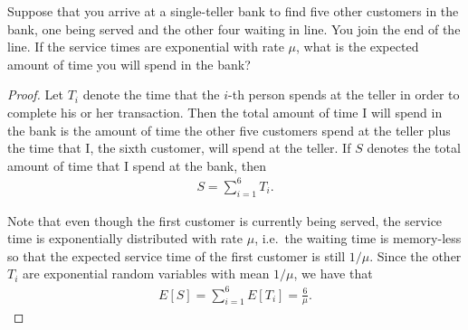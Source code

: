 \begin{problem}{5.2}
  Suppose that you arrive at a single-teller bank to find five other customers in
  the bank, one being served and the other four waiting in line. You join the end of the line.
  If the service times are exponential with rate $\mu$, what is the expected amount of time
  you will spend in the bank?
\end{problem}

\begin{proof}
  Let $T_i$ denote the time that the $i$-th person spends at the teller in order to complete his
  or her transaction.
  Then the total amount of time I will spend in the bank is the amount of time the other
  five customers spend at the teller plus the time that I, the sixth customer, will spend at the teller.
  If $S$ denotes the total amount of time that I spend at the bank, then
  \begin{align*}
    S = \sum_{i=1}^6 T_i.
  \end{align*}

  Note that even though the first customer is currently being served, the service time is
  exponentially distributed with rate $\mu$, i.e.\ the waiting time is memory-less so that
  the expected service time of the first customer is still $1/\mu$.
  Since the other $T_i$ are exponential random variables with mean $1/\mu$,
  we have that
  \begin{align*}
    E[S] = \sum_{i=1}^6 E[T_i] = \frac{6}{\mu}.
  \end{align*}
\end{proof}
\newpage
